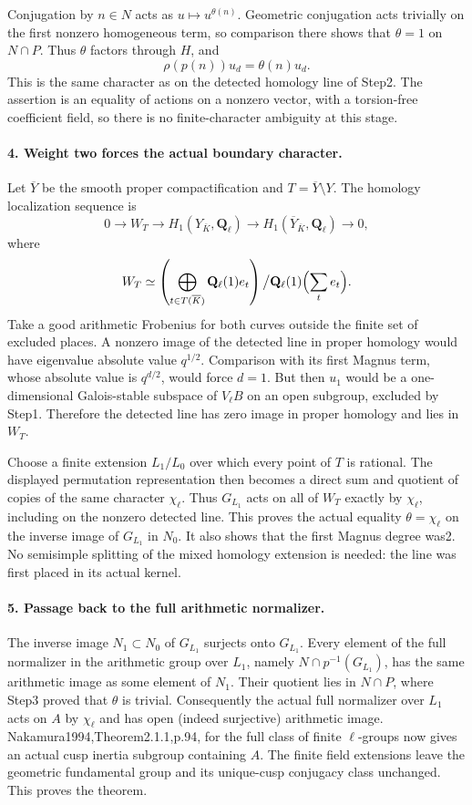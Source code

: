 Conjugation by $n\in N$ acts as $u\mapsto u^{\theta(n)}$.
Geometric conjugation acts trivially on the first nonzero
homogeneous term, so comparison there shows that $\theta=1$
on $N\cap P$. Thus $\theta$ factors through $H$, and
\[
 \rho(p(n))u_d=\theta(n)u_d.
\]
This is the same character as on the detected homology line
of Step2. The assertion is an equality of actions on a
nonzero vector, with a torsion-free coefficient field, so
there is no finite-character ambiguity at this stage.

\paragraph{4. Weight two forces the actual boundary character.}
Let $\overline Y$ be the smooth proper compactification and
$T=\overline Y\setminus Y$. The homology localization sequence is
\[
 0\longrightarrow W_T\longrightarrow
 H_1(Y_{\overline K},\mathbf Q_\ell)
 \longrightarrow H_1(\overline Y_{\overline K},\mathbf Q_\ell)
 \longrightarrow0,
\]
where
\[
 W_T\simeq\left(\bigoplus_{t\in T(\overline K)}
                    \mathbf Q_\ell(1)e_t\right)
          \big/\mathbf Q_\ell(1)\Bigl(\sum_t e_t\Bigr).
\]
Take a good arithmetic Frobenius for both curves outside the
finite set of excluded places. A nonzero image of the detected
line in proper homology would have eigenvalue absolute value
$q^{1/2}$. Comparison with its first Magnus term, whose
absolute value is $q^{d/2}$, would force $d=1$. But then
$u_1$ would be a one-dimensional Galois-stable subspace of
$V_\ell B$ on an open subgroup, excluded by Step1.
Therefore the detected line has zero image in proper homology
and lies in $W_T$.

Choose a finite extension $L_1/L_0$ over which every point of
$T$ is rational. The displayed permutation representation
then becomes a direct sum and quotient of copies of the
same character $\chi_\ell$. Thus $G_{L_1}$ acts on all of
$W_T$ exactly by $\chi_\ell$, including on the nonzero
detected line. This proves the actual equality
$\theta=\chi_\ell$ on the inverse image of $G_{L_1}$ in $N_0$.
It also shows that the first Magnus degree was2. No
semisimple splitting of the mixed homology extension is
needed: the line was first placed in its actual kernel.

\paragraph{5. Passage back to the full arithmetic normalizer.}
The inverse image $N_1\subset N_0$ of $G_{L_1}$ surjects
onto $G_{L_1}$. Every element of the full normalizer in the
arithmetic group over $L_1$, namely
$N\cap p^{-1}(G_{L_1})$, has the same arithmetic image as
some element of $N_1$. Their quotient lies in $N\cap P$,
where Step3 proved that $\theta$ is trivial. Consequently
the actual full normalizer over $L_1$ acts on $A$ by
$\chi_\ell$ and has open (indeed surjective) arithmetic image.
Nakamura1994,Theorem2.1.1,p.94, for the full class of finite
$\ell$-groups now gives an actual cusp inertia subgroup
containing $A$. The finite field extensions leave the
geometric fundamental group and its unique-cusp conjugacy
class unchanged. This proves the theorem.

